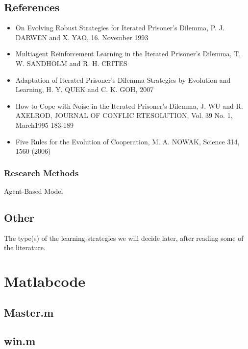 \subsection{References}

\begin{itemize}
\item On Evolving Robust Strategies for Iterated Prisoner's Dilemma, P. J. DARWEN and X. YAO, 16. November 1993\\[-6mm]
\item Multiagent Reinforcement Learning in the Iterated Prisoner's Dilemma, T. W. SANDHOLM and R. H. CRITES\\[-6mm]
\item Adaptation of Iterated Prisoner's Dilemma Strategies by Evolution and Learning, H. Y. QUEK and C. K. GOH, 2007\\[-6mm]
\item How to Cope with Noise in the Iterated Prisoner's Dilemma, J. WU and R. AXELROD, JOURNAL OF CONFLIC RTESOLUTION, Vol. 39 No. 1, March1995 183-189\\[-6mm]
\item Five Rules for the Evolution of Cooperation, M. A. NOWAK, Science 314, 1560 (2006)
\end{itemize}
\subsubsection{Research Methods}

Agent-Based Model

\subsection{Other}
The type(s) of the learning strategies we will decide later, after reading some of the literature.

\clearpage

\section{Matlabcode}

\subsection{Master.m}


\subsection{win.m}

